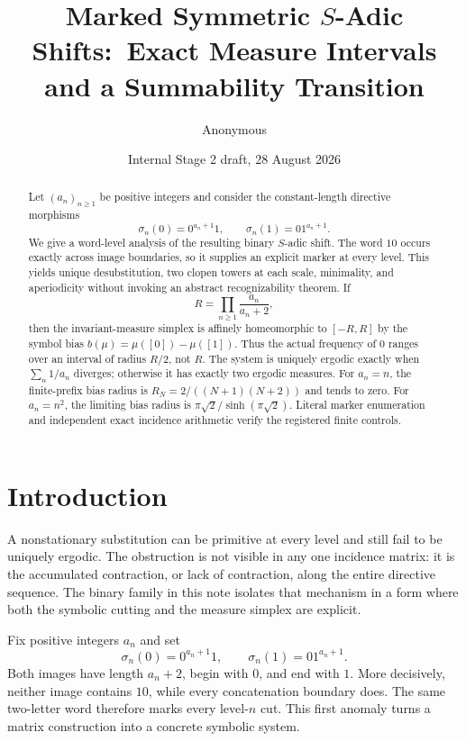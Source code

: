 \documentclass[11pt,a4paper]{amsart}
\title[Marked symmetric $S$-adic shifts]{Marked Symmetric $S$-Adic Shifts:\
Exact Measure Intervals and a Summability Transition}
\author{Anonymous}
\date{Internal Stage 2 draft, 28 August 2026}
\theoremstyle{definition}
\theoremstyle{remark}
\begin{document}
\begin{abstract}
Let $(a_n)_{n\geq1}$ be positive integers and consider the constant-length
directive morphisms
\[
 \sigma_n(0)=0^{a_n+1}1,
 \qquad
 \sigma_n(1)=01^{a_n+1}.
\]
We give a word-level analysis of the resulting binary $S$-adic shift.  The
word $10$ occurs exactly across image boundaries, so it supplies an explicit
marker at every level.  This yields unique desubstitution, two clopen towers
at each scale, minimality, and aperiodicity without invoking an abstract
recognizability theorem.  If
\[
 R=\prod_{n\geq1}\frac{a_n}{a_n+2},
\]
then the invariant-measure simplex is affinely homeomorphic to $[-R,R]$ by
the symbol bias $b(\mu)=\mu([0])-\mu([1])$.  Thus the actual frequency of
$0$ ranges over an interval of radius $R/2$, not $R$.  The system is uniquely
ergodic exactly when $\sum_n1/a_n$ diverges; otherwise it has exactly two
ergodic measures.  For $a_n=n$, the finite-prefix bias radius is
$R_N=2/((N+1)(N+2))$ and tends to zero.  For $a_n=n^2$, the limiting bias radius
is $\pi\sqrt2/\sinh(\pi\sqrt2)$.  Literal marker enumeration and independent
exact incidence arithmetic verify the registered finite controls.
\end{abstract}

\maketitle

\section{Introduction}

A nonstationary substitution can be primitive at every level and still fail
to be uniquely ergodic.  The obstruction is not visible in any one incidence
matrix: it is the accumulated contraction, or lack of contraction, along the
entire directive sequence.  The binary family in this note isolates that
mechanism in a form where both the symbolic cutting and the measure simplex
are explicit.

Fix positive integers $a_n$ and set
\begin{equation}\label{eq:morphisms-intro}
 \sigma_n(0)=0^{a_n+1}1,
 \qquad
 \sigma_n(1)=01^{a_n+1}.
\end{equation}
Both images have length $a_n+2$, begin with $0$, and end with $1$.  More
decisively, neither image contains $10$, while every concatenation boundary
does.  The same two-letter word therefore marks every level-$n$ cut.  This
first anomaly turns a matrix construction into a concrete symbolic system.
\end{document}
